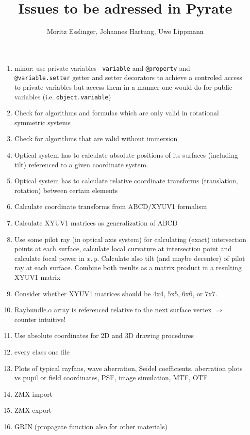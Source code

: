 \documentclass[12pt,a4paper,twoside,openright,BCOR10mm,headsepline,titlepage,abstracton,chapterprefix,final]{scrreprt}
\title{Issues to be adressed in Pyrate}
\author{Moritz Esslinger, Johannes Hartung, Uwe Lippmann}
\begin{document}
\maketitle

\begin{enumerate}
 \item minor: use private variables {\tt \underline{\;}\,\underline{\;}variable} and {\tt @property} and {\tt @variable.setter} getter and setter decorators to
      achieve a controled access to private variables but access them in a manner one would do for public variables (i.e. {\tt object.variable})
 \item Check for algorithms and formulas which are only valid in rotational symmetric systems
 \item Check for algorithms that are valid without immersion
 \item Optical system has to calculate absolute positions of its surfaces (including tilt) referenced to a given coordinate system.
 \item Optical system has to calculate relative coordinate transforms (translation, rotation) between certain elements
 \item Calculate coordinate transforms from ABCD/XYUV1 formalism
 \item Calculate XYUV1 matrices as generalization of ABCD
 \item Use some pilot ray (in optical axis system) for calculating (exact) intersection points at each surface, calculate local curvature at intersection point
      and calculate focal power in $x, y$. Calculate also tilt (and maybe decenter) of pilot ray at each surface. Combine both results as a matrix product in a resulting
      XYUV1 matrix
 \item Consider whether XYUV1 matrices should be 4x4, 5x5, 6x6, or 7x7.
 \item Raybundle.o array is referenced relative to the next surface vertex $\Rightarrow$ counter intuitive!
 \item Use absolute coordinates for 2D and 3D drawing procedures
 \item every class one file
 \item Plots of typical rayfans, wave aberration, Seidel coefficients, aberration plots vs pupil or field coordinates, PSF, image simulation, MTF, OTF
 \item ZMX import
 \item ZMX export
 \item GRIN (propagate function also for other materials)

\end{enumerate}
\end{document}

